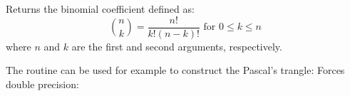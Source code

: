 Returns the binomial coefficient defined as:
\begin{equation}
  \binom{n}{k} = \frac{n!}{k! (n-k)!} \text{ for } 0 \le k \le n
\end{equation}
where $n$ and $k$ are the first and second arguments, respectively.

The routine can be used for example to construct the Pascal's trangle:
Forces double precision:
\gdlimsldisclaimer
